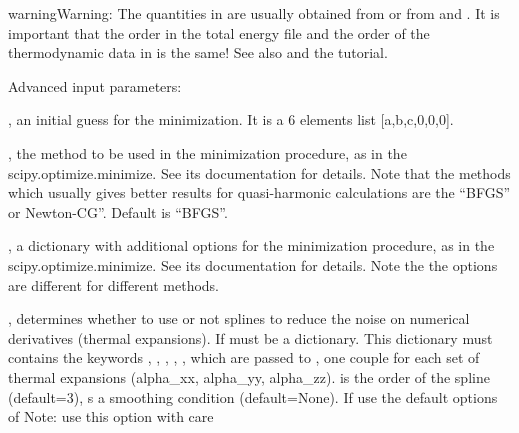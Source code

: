 \documentclass[letterpaper,10pt,english]{sphinxmanual}
\begin{document}
\begin{fulllineitems}
\begin{sphinxadmonition}{warning}{Warning:}
The quantities in  are usually obtained from 
or from  and . It is
important that the order in the total energy file  and the order of
the thermodynamic data in  is the same!  See also  and 
the tutorial.
\end{sphinxadmonition}

Advanced input parameters:

, an initial guess for the minimization. It is a 6 elements list 
{[}a,b,c,0,0,0{]}.

, the method to be used in the minimization procedure, as in the
scipy.optimize.minimize. See its documentation for details. Note that the 
methods which usually gives better results for quasi-harmonic calculations
are the ``BFGS'' or Newton-CG''. Default is ``BFGS''.

, a dictionary with additional options for the minimization 
procedure, as in the scipy.optimize.minimize. See its documentation for details.
Note the the options are different for different methods.

, determines whether to use or not splines to reduce the noise
on numerical derivatives (thermal expansions). If 
must be a dictionary. This dictionary must contains the keywords , ,
, , ,  which are passed to , 
one couple for each set of thermal expansions (alpha\_xx, alpha\_yy, alpha\_zz).
 is the order of the spline (default=3), s a smoothing condition (default=None).
If  use the default options of 
Note: use this option with care

\end{fulllineitems}

\end{document}

